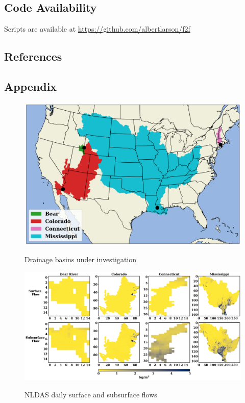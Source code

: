\begin{refsection}
\newpage
\subsection{Code Availability}
Scripts are available at \url{https://github.com/albertlarson/f2f}

\subsection{References}

\printbibliography[heading=none]
\end{refsection}

\newpage
\subsection{Appendix}

\begin{figure}[!ht]
	\centering
    \caption{Drainage basins under investigation}
	\includegraphics[width=1.0\linewidth]{m1/ims/fig1_1.png}
    \label{fig1_1}
\end{figure}

\begin{figure}[!ht]
	\centering
    \caption{NLDAS daily surface and subsurface flows}
	\includegraphics[width=1.0\linewidth]{m1/ims/fig1_2.png}
    \label{fig1_2}
\end{figure}

